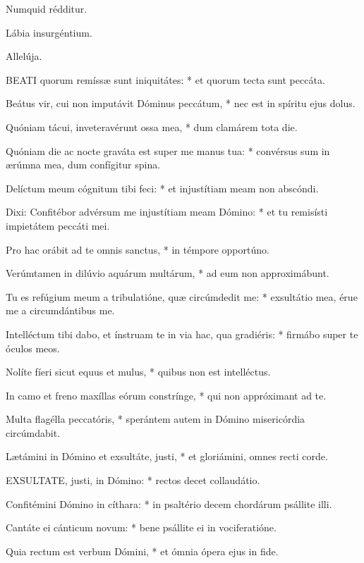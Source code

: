  Numquid rédditur.


 Lábia insurgéntium.

  Allelúja.


\lettrine[lines=2]{B}{EATI} quorum remíssæ sunt iniquitátes: * et quorum tecta sunt peccáta.

Beátus vir, cui non imputávit Dóminus peccátum, * nec est in spíritu ejus dolus.

Quóniam tácui, inveteravérunt ossa mea, * dum clamárem tota die.

Quóniam die ac nocte graváta est super me manus tua: * convérsus sum in ærúmna mea, dum confígitur spina.

Delíctum meum cógnitum tibi feci: * et injustítiam meam non abscóndi.

Dixi: Confitébor advérsum me injustítiam meam Dómino: * et tu remisísti impietátem peccáti mei.

Pro hac orábit ad te omnis sanctus, * in témpore opportúno.

Verúmtamen in dilúvio aquárum multárum, * ad eum non approximábunt.

Tu es refúgium meum a tribulatióne, quæ circúmdedit me: * exsultátio mea, érue me a circumdántibus me.

Intelléctum tibi dabo, et ínstruam te in via hac, qua gradiéris: * firmábo super te óculos meos.

Nolíte fíeri sicut equus et mulus, * quibus non est intelléctus.

In camo et freno maxíllas eórum constrínge, * qui non appróximant ad te.

Multa flagélla peccatóris, * sperántem autem in Dómino misericórdia circúmdabit.

Lætámini in Dómino et exsultáte, justi, * et gloriámini, omnes recti corde.


\lettrine[lines=2]{E}{XSULTATE}, justi, in Dómino: * rectos decet collaudátio.

Confitémini Dómino in cíthara: * in psaltério decem chordárum psállite illi.

Cantáte ei cánticum novum: * bene psállite ei in vociferatióne.

Quia rectum est verbum Dómini, * et ómnia ópera ejus in fide.

